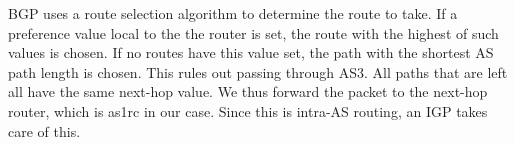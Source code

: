 BGP uses a route selection algorithm to determine the route to take. If a preference value local to the the router is set, the route with the highest of such values is chosen. If no routes have this value set, the path with the shortest AS path length is chosen. This rules out passing through AS3. All paths that are left all have the same next-hop value. We thus forward the packet to the next-hop router, which is as1rc in our case. Since this is intra-AS routing, an IGP takes care of this.